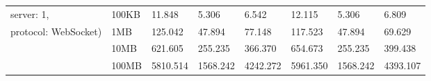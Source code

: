 \begin{table}[htbp]
\begin{tabular}{m{} m{} m{} m{} m{} m{} m{} m{}}
    server: 1,                       & 100KB      & 11.848            & 5.306    & 6.542                   & 12.115            & 5.306    & 6.809                   \\
    protocol: WebSocket)             & 1MB        & 125.042           & 47.894   & 77.148                  & 117.523           & 47.894   & 69.629                  \\
                                     & 10MB       & 621.605           & 255.235  & 366.370                 & 654.673           & 255.235  & 399.438                 \\
                                     & 100MB      & 5810.514          & 1568.242 & 4242.272                & 5961.350          & 1568.242 & 4393.107                \\ \hline
    \end{tabular}%
    \end{table}




